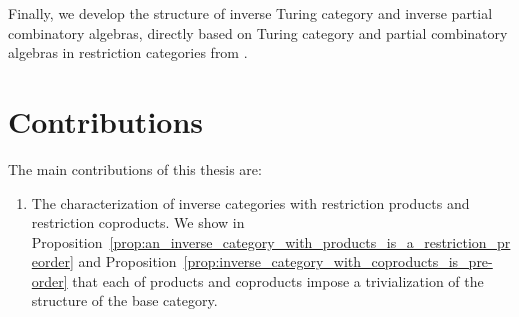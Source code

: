 Finally, we develop the structure of inverse Turing category and inverse partial combinatory
algebras, directly based on Turing category and partial combinatory algebras in restriction
categories from \cite{cockett-hostra08-intro-to-turing,cockett2010:categories-and-computability}.

\section{Contributions}
\label{sec:contributions}


The main contributions of this thesis are:
\begin{enumerate}
\item The characterization of inverse categories with restriction products and restriction
  coproducts.  We show in
  Proposition~\ref{prop:an_inverse_category_with_products_is_a_restriction_preorder} and
  Proposition~\ref{prop:inverse_category_with_coproducts_is_pre-order} that each of products and
  coproducts impose a trivialization of the structure of the base category.


\end{enumerate}
